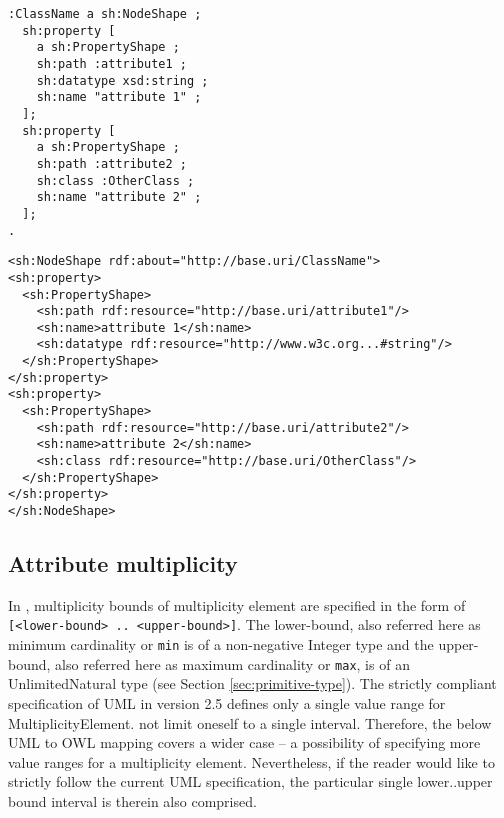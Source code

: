 \vspace{-\parskip}
\begin{minipage}[b]{.37\textwidth}
\begin{lstlisting}[language=Turtle, caption={Property class and datatype constraint in Turtle syntax}, captionpos=b]
:ClassName a sh:NodeShape ;
  sh:property [
    a sh:PropertyShape ;
    sh:path :attribute1 ;
    sh:datatype xsd:string ;
    sh:name "attribute 1" ;
  ];
  sh:property [
    a sh:PropertyShape ;
    sh:path :attribute2 ;
    sh:class :OtherClass ;
    sh:name "attribute 2" ;
  ];
.    
\end{lstlisting}
\end{minipage}%
\quad\vspace{-\parskip}
\begin{minipage}[b]{.55\textwidth}
\begin{lstlisting}[language=RDF/XML, caption={Property class and datatype constraint in RDF/XML syntax}, captionpos=b]
<sh:NodeShape rdf:about="http://base.uri/ClassName">
<sh:property>
  <sh:PropertyShape>
    <sh:path rdf:resource="http://base.uri/attribute1"/>
    <sh:name>attribute 1</sh:name>
    <sh:datatype rdf:resource="http://www.w3c.org...#string"/>
  </sh:PropertyShape>
</sh:property>
<sh:property>
  <sh:PropertyShape>
    <sh:path rdf:resource="http://base.uri/attribute2"/>
    <sh:name>attribute 2</sh:name>
    <sh:class rdf:resource="http://base.uri/OtherClass"/>
  </sh:PropertyShape>
</sh:property>
</sh:NodeShape>
\end{lstlisting}
\end{minipage}
\vspace{-\parskip}

\subsection{Attribute multiplicity}
\label{sec:attribute-multiplicity}

In \citep{uml2.5}, multiplicity bounds of multiplicity element are specified in the form of
\texttt{[<lower-bound> .. <upper-bound>]}. The lower-bound, also referred here as minimum cardinality or \texttt{min} is of a non-negative
Integer type and the upper-bound, also referred here as maximum cardinality or \texttt{max}, is of an UnlimitedNatural type (see Section \ref{sec:primitive-type}). The strictly
compliant specification of UML in version 2.5 defines only a single value range
for MultiplicityElement. 
not limit oneself to a single interval. Therefore, the below UML to OWL
mapping covers a wider case – a possibility of specifying more value ranges for
a multiplicity element. Nevertheless, if the reader would like to strictly follow the
current UML specification, the particular single lower..upper bound interval is
therein also comprised.

